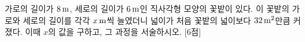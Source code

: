 가로의 길이가 $8\mkern3mu \mathrm{m}$, 세로의 길이가 $6\mkern3mu \mathrm{m}$인 직사각형 모양의 꽃밭이 있다. 이 꽃밭의 가로와 세로의 길이를 각각 $x\mkern3mu \mathrm{m}$씩 늘였더니 넓이가 처음 꽃밭의 넓이보다 $32\mkern3mu \mathrm{m}^2$만큼 커졌다. 이때 $x$의 값을 구하고, 그 과정을 서술하시오. \mbox{[6점]}
